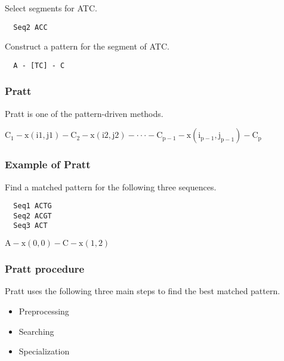 \noindent
Select segments for ATC.
\begin{verbatim}
  Seq2 ACC
\end{verbatim}

\noindent
Construct a pattern for the segment of ATC.
\begin{verbatim}
  A - [TC] - C
\end{verbatim}

%
%
\subsubsection*{Pratt}
Pratt is one of the pattern-driven methods. 

$\mathrm{C_1 
-  x(i1, j1) 
-  C_2 
- x(i2, j2) 
-   \cdot\cdot\cdot 
-  C_{p-1} 
-   x(i_{p - 1}, j_{p -1})
-   C_p}$

%
%
\subsubsection*{Example of Pratt}
Find a matched pattern for the following three sequences.
\begin{verbatim}
  Seq1 ACTG
  Seq2 ACGT
  Seq3 ACT
\end{verbatim}

$\mathrm{A - x(0,0) - C - x(1,2)}$

%
%
\subsubsection*{Pratt procedure}
Pratt uses the following three main steps to find the best matched pattern.

\begin{itemize}
\item Preprocessing
\item Searching
\item Specialization
\end{itemize}

\bigskip 

%
